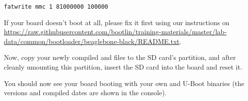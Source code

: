 \begin{verbatim}
fatwrite mmc 1 81000000 100000
\end{verbatim}

If your board doesn't boot at all, please fix it first using our instructions
on
\url{https://raw.githubusercontent.com/bootlin/training-materials/master/lab-data/common/bootloader/beaglebone-black/README.txt}.

Now, copy your newly compiled  and  files to
the SD card's  partition, and after cleanly umounting this
partition, insert the SD card into the board and reset it.

You should now see your board booting with your own  and U-Boot
binaries (the versions and compiled dates are shown in the console). 
